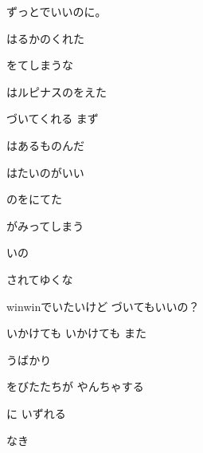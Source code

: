 \documentclass[a4paper,tate,twocolumn,12pt]{ltjtarticle}
\begin{document}
\thispagestyle{empty}

\begin{center}
{\LARGE {}}

{\large ずっとでいいのに。}
\end{center}

\vspace{1em}

\begin{flushleft}

\noindent\begin{minipage}{\linewidth}
はるかのくれた

をてしまうな

はルピナスのをえた

づいてくれる まず

はあるものんだ

はたいのがいい

のをにてた

がみってしまう
\end{minipage}

\vspace{2em}

\noindent\begin{minipage}{\linewidth}
いの

されてゆくな

winwinでいたいけど づいてもいいの？
\end{minipage}

\vspace{2em}

\noindent\begin{minipage}{\linewidth}
いかけても いかけても また

 うばかり

をびたたちが やんちゃする

に いずれる

なき


\end{minipage}
\end{flushleft}
\end{document}

